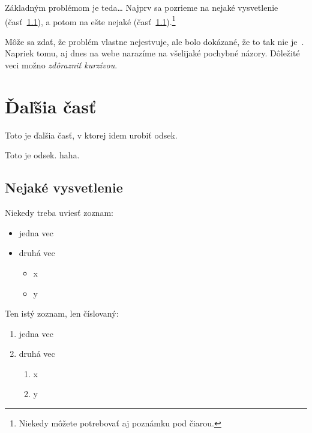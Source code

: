 \documentclass[11pt ,english,a4paper]{article}
\begin{document}
Základným problémom je teda\ldots{} Najprv sa pozrieme na nejaké vysvetlenie (časť~\ref{ina:nejake}), a potom na ešte nejaké (časť~\ref{ina:nejake}).\footnote{Niekedy môžete potrebovať aj poznámku pod čiarou.}

Môže sa zdať, že problém vlastne nejestvuje\cite{bar21health}, ale bolo dokázané, že to tak nie je~\cite{bar21health}. Napriek tomu, aj dnes na webe narazíme na všelijaké pochybné názory\cite{bar21health}. Dôležité veci možno \emph{zdôrazniť kurzívou}.

\section{Ďaľšia časť}
Toto je ďalšia časť, v ktorej idem urobiť odsek.

Toto je odsek. haha.

\subsection{Nejaké vysvetlenie} \label{ina:nejake}

Niekedy treba uviesť zoznam:

\begin{itemize}
\item jedna vec
\item druhá vec
	\begin{itemize}
	\item x
	\item y
	\end{itemize}
\end{itemize}

Ten istý zoznam, len číslovaný:

\begin{enumerate}
\item jedna vec
\item druhá vec
	\begin{enumerate}
	\item x
	\item y
	\end{enumerate}
\end{enumerate}



\end{document}
